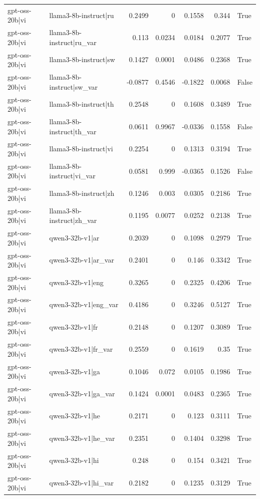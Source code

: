 \begin{table}
\begin{tabular}{l l r r r r l}
gpt-oss-20b|vi & llama3-8b-instruct|ru & 0.2499 & 0 & 0.1558 & 0.344 & True \\
gpt-oss-20b|vi & llama3-8b-instruct|ru_var & 0.113 & 0.0234 & 0.0184 & 0.2077 & True \\
gpt-oss-20b|vi & llama3-8b-instruct|sw & 0.1427 & 0.0001 & 0.0486 & 0.2368 & True \\
gpt-oss-20b|vi & llama3-8b-instruct|sw_var & -0.0877 & 0.4546 & -0.1822 & 0.0068 & False \\
gpt-oss-20b|vi & llama3-8b-instruct|th & 0.2548 & 0 & 0.1608 & 0.3489 & True \\
gpt-oss-20b|vi & llama3-8b-instruct|th_var & 0.0611 & 0.9967 & -0.0336 & 0.1558 & False \\
gpt-oss-20b|vi & llama3-8b-instruct|vi & 0.2254 & 0 & 0.1313 & 0.3194 & True \\
gpt-oss-20b|vi & llama3-8b-instruct|vi_var & 0.0581 & 0.999 & -0.0365 & 0.1526 & False \\
gpt-oss-20b|vi & llama3-8b-instruct|zh & 0.1246 & 0.003 & 0.0305 & 0.2186 & True \\
gpt-oss-20b|vi & llama3-8b-instruct|zh_var & 0.1195 & 0.0077 & 0.0252 & 0.2138 & True \\
gpt-oss-20b|vi & qwen3-32b-v1|ar & 0.2039 & 0 & 0.1098 & 0.2979 & True \\
gpt-oss-20b|vi & qwen3-32b-v1|ar_var & 0.2401 & 0 & 0.146 & 0.3342 & True \\
gpt-oss-20b|vi & qwen3-32b-v1|eng & 0.3265 & 0 & 0.2325 & 0.4206 & True \\
gpt-oss-20b|vi & qwen3-32b-v1|eng_var & 0.4186 & 0 & 0.3246 & 0.5127 & True \\
gpt-oss-20b|vi & qwen3-32b-v1|fr & 0.2148 & 0 & 0.1207 & 0.3089 & True \\
gpt-oss-20b|vi & qwen3-32b-v1|fr_var & 0.2559 & 0 & 0.1619 & 0.35 & True \\
gpt-oss-20b|vi & qwen3-32b-v1|ga & 0.1046 & 0.072 & 0.0105 & 0.1986 & True \\
gpt-oss-20b|vi & qwen3-32b-v1|ga_var & 0.1424 & 0.0001 & 0.0483 & 0.2365 & True \\
gpt-oss-20b|vi & qwen3-32b-v1|he & 0.2171 & 0 & 0.123 & 0.3111 & True \\
gpt-oss-20b|vi & qwen3-32b-v1|he_var & 0.2351 & 0 & 0.1404 & 0.3298 & True \\
gpt-oss-20b|vi & qwen3-32b-v1|hi & 0.248 & 0 & 0.154 & 0.3421 & True \\
gpt-oss-20b|vi & qwen3-32b-v1|hi_var & 0.2182 & 0 & 0.1235 & 0.3129 & True \\

\end{tabular}
\end{table}
